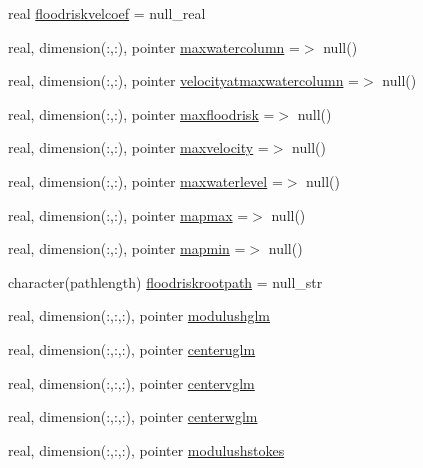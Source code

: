 \begin{DoxyCompactItemize}
real \mbox{\hyperlink{structmodulehydrodynamic_1_1t__output_a1d3d22d76ecbceb7e43764e32047b46f}{floodriskvelcoef}} = null\+\_\+real
\item 
real, dimension(\+:,\+:), pointer \mbox{\hyperlink{structmodulehydrodynamic_1_1t__output_a8763a344a9bb44b9bbf32bd2c6323994}{maxwatercolumn}} =$>$ null()
\item 
real, dimension(\+:,\+:), pointer \mbox{\hyperlink{structmodulehydrodynamic_1_1t__output_a54df7b7aed600875121277d136076620}{velocityatmaxwatercolumn}} =$>$ null()
\item 
real, dimension(\+:,\+:), pointer \mbox{\hyperlink{structmodulehydrodynamic_1_1t__output_a49ada6a05c83ad2235561b67165e7fd9}{maxfloodrisk}} =$>$ null()
\item 
real, dimension(\+:,\+:), pointer \mbox{\hyperlink{structmodulehydrodynamic_1_1t__output_a721396cfefa595e34fff4ba2e44d2bdf}{maxvelocity}} =$>$ null()
\item 
real, dimension(\+:,\+:), pointer \mbox{\hyperlink{structmodulehydrodynamic_1_1t__output_a8f118d33c71fa295730e32d973827826}{maxwaterlevel}} =$>$ null()
\item 
real, dimension(\+:,\+:), pointer \mbox{\hyperlink{structmodulehydrodynamic_1_1t__output_ab09e3fceea8a4241cc815a36e41a6298}{mapmax}} =$>$ null()
\item 
real, dimension(\+:,\+:), pointer \mbox{\hyperlink{structmodulehydrodynamic_1_1t__output_a5bac75e0fb2fef3eb47c88489c6211b4}{mapmin}} =$>$ null()
\item 
character(pathlength) \mbox{\hyperlink{structmodulehydrodynamic_1_1t__output_a8ea35f9e116a95e39e1973e1f0677271}{floodriskrootpath}} = null\+\_\+str
\item 
real, dimension(\+:,\+:,\+:), pointer \mbox{\hyperlink{structmodulehydrodynamic_1_1t__output_ac9a9f98de34cd49ee21541d1c2b660f9}{modulushglm}}
\item 
real, dimension(\+:,\+:,\+:), pointer \mbox{\hyperlink{structmodulehydrodynamic_1_1t__output_a6a56aa802383340727089db59da4fd5d}{centeruglm}}
\item 
real, dimension(\+:,\+:,\+:), pointer \mbox{\hyperlink{structmodulehydrodynamic_1_1t__output_a41fd47b7abef92e40f415b4872b6428d}{centervglm}}
\item 
real, dimension(\+:,\+:,\+:), pointer \mbox{\hyperlink{structmodulehydrodynamic_1_1t__output_a79443cdc3744956c0ff8f57da0dd9fad}{centerwglm}}
\item 
real, dimension(\+:,\+:,\+:), pointer \mbox{\hyperlink{structmodulehydrodynamic_1_1t__output_a480951abe7262194734a40086a39595f}{modulushstokes}}

\end{DoxyCompactItemize}
